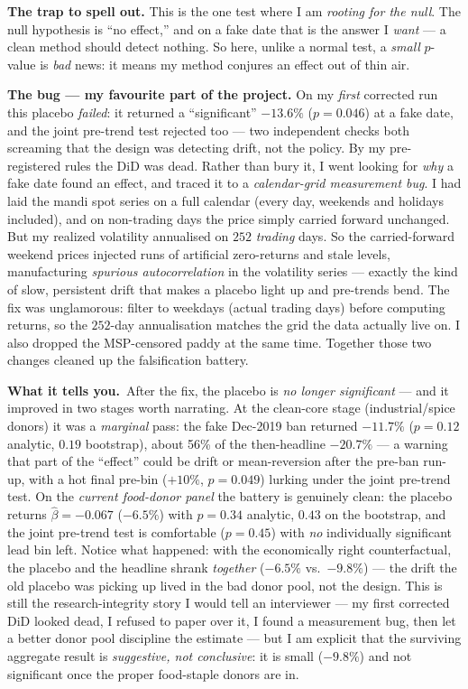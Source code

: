 \documentclass[11pt]{article}
\newcommand{\tells}{\smallskip\noindent\textbf{What it tells you.}\ }
\begin{document}
\smallskip\noindent\textbf{The trap to spell out.} This is the one test where I am \emph{rooting for
the null}. The null hypothesis is ``no effect,'' and on a fake date that is the answer I \emph{want}
--- a clean method should detect nothing. So here, unlike a normal test, a \emph{small} $p$-value is
\emph{bad} news: it means my method conjures an effect out of thin air.

\smallskip\noindent\textbf{The bug --- my favourite part of the project.} On my \emph{first}
corrected run this placebo \emph{failed}: it returned a ``significant'' $-13.6\%$ ($p=0.046$) at a
fake date, and the joint pre-trend test rejected too --- two independent checks both screaming that
the design was detecting drift, not the policy. By my pre-registered rules the DiD was dead. Rather
than bury it, I went looking for \emph{why} a fake date found an effect, and traced it to a
\emph{calendar-grid measurement bug}. I had laid the mandi spot series on a full calendar (every
day, weekends and holidays included), and on non-trading days the price simply carried forward
unchanged. But my realized volatility annualised on $252$ \emph{trading} days. So the carried-forward
weekend prices injected runs of artificial zero-returns and stale levels, manufacturing
\emph{spurious autocorrelation} in the volatility series --- exactly the kind of slow, persistent
drift that makes a placebo light up and pre-trends bend. The fix was unglamorous: filter to weekdays
(actual trading days) before computing returns, so the $252$-day annualisation matches the grid the
data actually live on. I also dropped the MSP-censored paddy at the same time. Together those two
changes cleaned up the falsification battery.

\tells After the fix, the placebo is \emph{no longer significant} --- and it improved in two
stages worth narrating. At the clean-core stage (industrial/spice donors) it was a \emph{marginal}
pass: the fake Dec-2019 ban returned $-11.7\%$ ($p = 0.12$ analytic, $0.19$ bootstrap), about 56\%
of the then-headline $-20.7\%$ --- a warning that part of the ``effect'' could be drift or
mean-reversion after the pre-ban run-up, with a hot final pre-bin ($+10\%$, $p=0.049$) lurking
under the joint pre-trend test. On the \emph{current food-donor panel} the battery is genuinely
clean: the placebo returns $\hat\beta = -0.067$ ($-6.5\%$) with $p = 0.34$ analytic, $0.43$ on the
bootstrap, and the joint pre-trend test is comfortable ($p = 0.45$) with \emph{no} individually
significant lead bin left. Notice what happened: with the economically right counterfactual, the
placebo and the headline shrank \emph{together} ($-6.5\%$ vs.\ $-9.8\%$) --- the drift the old
placebo was picking up lived in the bad donor pool, not the design. This is still the
research-integrity story I would tell an interviewer --- my first corrected DiD looked dead, I
refused to paper over it, I found a measurement bug, then let a better donor pool discipline the
estimate --- but I am explicit that the surviving aggregate result is \emph{suggestive, not
conclusive}: it is small ($-9.8\%$) and not significant once the proper food-staple donors are in.
\end{document}
